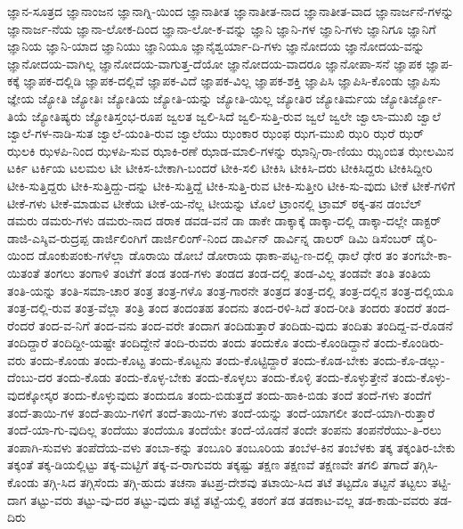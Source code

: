 {ಜ್ಞಾನ-ಸೂತ್ರದ
ಜ್ಞಾನಾಂಜನ
ಜ್ಞಾನಾಗ್ನಿ-ಯಿಂದ
ಜ್ಞಾನಾತೀತ
ಜ್ಞಾನಾತೀತ-ನಾದ
ಜ್ಞಾನಾತೀತ-ವಾದ
ಜ್ಞಾನಾರ್ಜನೆ-ಗಳನ್ನು
ಜ್ಞಾನಾರ್ಜ-ನೆಯ
ಜ್ಞಾನಾ-ಲೋಕ-ದಿಂದ
ಜ್ಞಾನಾ-ಲೋ-ಕ-ವನ್ನು
ಜ್ಞಾನಿ
ಜ್ಞಾನಿ-ಗಳ
ಜ್ಞಾನಿ-ಗಳು
ಜ್ಞಾನಿಗೂ
ಜ್ಞಾನಿಗೆ
ಜ್ಞಾನಿಯ
ಜ್ಞಾನಿ-ಯಾದ
ಜ್ಞಾನಿಯು
ಜ್ಞಾನಿಯೂ
ಜ್ಞಾನೈಶ್ವರ್ಯಾ-ದಿ-ಗಳು
ಜ್ಞಾನೋದಯ
ಜ್ಞಾನೋದಯ-ವನ್ನು
ಜ್ಞಾನೋದಯ-ವಾಗಿಲ್ಲ
ಜ್ಞಾನೋದಯ-ವಾಗುತ್ತ-ದೆಯೋ
ಜ್ಞಾನೋದಯ-ವಾದರೂ
ಜ್ಞಾನೋಪಾ-ಸನೆ
ಜ್ಞಾಪಕ
ಜ್ಞಾಪ-ಕಕ್ಕೆ
ಜ್ಞಾಪಕ-ದಲ್ಲಿಡಿ
ಜ್ಞಾಪಕ-ದಲ್ಲಿವೆ
ಜ್ಞಾಪಕ-ವಿದೆ
ಜ್ಞಾಪಕ-ವಿಲ್ಲ
ಜ್ಞಾಪಕ-ಶಕ್ತಿ
ಜ್ಞಾಪಿಸಿ
ಜ್ಞಾಪಿಸಿ-ಕೊಂಡು
ಜ್ಞಾಪಿಸು
ಜ್ಞೇಯ
ಜ್ಯೋತಿ
ಜ್ಯೋತಿಃ
ಜ್ಯೋತಿಯ
ಜ್ಯೋತಿ-ಯನ್ನು
ಜ್ಯೋತಿ-ಯಿಲ್ಲ
ಜ್ಯೋತಿರ
ಜ್ಯೋತಿರ್ಮಯ
ಜ್ಯೋತಿರ್ಜ್ಯೋ-ತಿಯೆ
ಜ್ಯೋತಿಷ್ಯರು
ಜ್ಯೋತಿಸ್ತಂಭ-ರೂಪ
ಜ್ವಲತ
ಜ್ವಲಿ-ಸಿದೆ
ಜ್ವಲಿ-ಸುತ್ತಿ-ರುವ
ಜ್ವಲೆ
ಜ್ವಲೇ
ಜ್ವಾಲಾ-ಮುಖಿ
ಜ್ವಾಲೆ
ಜ್ವಾಲೆ-ಗಳ-ನಾಡಿ-ಸುತ
ಜ್ವಾಲೆ-ಯಂತಿ-ರುವ
ಜ್ವಾಲೆಯು
ಝಂಕಾರ
ಝಂಫ
ಝಗ-ಮುಖಿ
ಝರಿ
ಝರೆ
ಝರ್
ಝಲಕಿ
ಝಳಪಿ-ನಿಂದ
ಝಳಪಿ-ಸುವ
ಝಾಕಿ-ರಣೆ
ಝಾಡ-ಮಾಲಿ-ಗಳನ್ನು
ಝಾನ್ಸಿ-ರಾ-ಣಿಯು
ಝೃಂಬಿತ
ಝೇಲಮಿನ
ಟರ್ಕಿ
ಟರ್ಕಿಯ
ಟಲಮಲ
ಟೀ
ಟೀಕಿಸ-ಬೇಕಾಗಿ-ಬಂದರೆ
ಟೀಕಿ-ಸಲಿ
ಟೀಕಿಸಿ
ಟೀಕಿಸಿ-ದರು
ಟೀಕಿಸಿದ್ದರು
ಟೀಕಿಸಿದ್ದೀರಿ
ಟೀಕಿ-ಸುತ್ತಿದ್ದರು
ಟೀಕಿ-ಸುತ್ತಿದ್ದು-ದನ್ನು
ಟೀಕಿ-ಸುತ್ತಿದ್ದೆ
ಟೀಕಿ-ಸುತ್ತಿ-ರುವ
ಟೀಕಿ-ಸುತ್ತೀರಿ
ಟೀಕಿ-ಸು-ವುದು
ಟೀಕೆ
ಟೀಕೆ-ಗಳಿಗೆ
ಟೀಕೆ-ಗಳು
ಟೀಕೆ-ಮಾಡುವ
ಟೀಕೆಯ
ಟೀಕೆ-ಯ-ನೆಲ್ಲ
ಟೀಯನ್ನು
ಟೊಲೆ
ಟ್ರಾಂನಲ್ಲಿ
ಟ್ರಾಮ್
ಠಕ್ಕ-ತನ
ಡಂಬೆಲ್
ಡಮರು
ಡಮರು-ಗಳು
ಡಮರು-ನಾದ
ಡರಾಕ
ಡವಡ-ವನೆ
ಡಾ
ಡಾಕೇ
ಡಾಕ್ಕಾಕ್ಕೆ
ಡಾಕ್ಕಾ-ದಲ್ಲಿ
ಡಾಕ್ಕಾ-ದಲ್ಲೇ
ಡಾಕ್ಟರ್
ಡಾಜಿ-ಎಸ್ಶಿವ-ರುದ್ರಪ್ಪ
ಡಾರ್ಜಿಲಿಂಗಿಗೆ
ಡಾರ್ಜಿಲಿಂಗ್-ನಿಂದ
ಡಾರ್ವಿನ್
ಡಾರ್ವಿನ್ನ
ಡಾಲರ್
ಡಿಮಿ
ಡಿಸೆಂಬರ್
ಡೈರಿ-ಯಿಂದ
ಡೊಂಕುಪಂಕು-ಗಳೆಲ್ಲಾ
ಡೊರಾಯಿ
ಡೋಬೆ
ಡೋರಾಯ
ಢಾಕಾ-ಪಟ್ಟ-ಣ-ದಲ್ಲಿ
ಢಾಲೆ
ಢೇರ
ತಂ
ತಂಗಬೇ-ಕಾ-ಯಿತಂತೆ
ತಂಗಲು
ತಂಗಾಳಿ
ತಂಟೆಗೆ
ತಂಡ
ತಂಡ-ಗಳು
ತಂಡದ
ತಂಡ-ದಲ್ಲಿ
ತಂಡ-ವಿಲ್ಲ
ತಂಡವೇ
ತಂತಿ
ತಂತಿಯ
ತಂತಿ-ಯನ್ನು
ತಂತಿ-ಸಮಾ-ಚಾರ
ತಂತ್ರ
ತಂತ್ರ-ಗಳೊ
ತಂತ್ರ-ಗಾರನೇ
ತಂತ್ರದ
ತಂತ್ರ-ದಲ್ಲಿ
ತಂತ್ರ-ದಲ್ಲಿನ
ತಂತ್ರ-ದಲ್ಲಿಯೂ
ತಂತ್ರ-ದಲ್ಲಿ-ರುವ
ತಂತ್ರ-ವೆಲ್ಲಾ
ತಂತ್ರಿ
ತಂದ
ತಂದಂತಹ
ತಂದನು
ತಂದ-ರಳಿ-ಸಿದೆ
ತಂದ-ರೀತಿ
ತಂದರು
ತಂದರೆ
ತಂದ-ರೆಂದರೆ
ತಂದ-ವ-ನಿಗೆ
ತಂದ-ವನು
ತಂದ-ವರೇ
ತಂದಾಗ
ತಂದಿಡುತ್ತಾರೆ
ತಂದಿಡು-ವುದು
ತಂದಿತು
ತಂದಿದ್ದ-ವ-ರೊಡನೆ
ತಂದಿದ್ದಾರೆ
ತಂದಿದ್ದೀ-ಯಷ್ಟೇ
ತಂದಿದ್ದೇನೆ
ತಂದಿ-ರುವರು
ತಂದು
ತಂದುಕೊ
ತಂದು-ಕೊಂಡಿದ್ದಾನೆ
ತಂದು-ಕೊಂಡಿರು-ವರು
ತಂದು-ಕೊಂಡು
ತಂದು-ಕೊಟ್ಟ
ತಂದು-ಕೊಟ್ಟನು
ತಂದು-ಕೊಟ್ಟಿದ್ದಾರೆ
ತಂದು-ಕೊಡ-ಬೇಕು
ತಂದು-ಕೊ-ಡಲ್ಲು-ದೆಂಬು-ದರ
ತಂದು-ಕೊಡು
ತಂದು-ಕೊಳ್ಳ-ಬೇಕು
ತಂದು-ಕೊಳ್ಳಲು
ತಂದು-ಕೊಳ್ಳಿ
ತಂದು-ಕೊಳ್ಳುತ್ತೇನೆ
ತಂದು-ಕೊಳ್ಳು-ವುದಕ್ಕೋಸ್ಕರ
ತಂದು-ಕೊಳ್ಳುವುದು
ತಂದುದೂ
ತಂದು-ಬಿಡುತ್ತದೆ
ತಂದು-ಹಾಕಿ-ಬಿಡು
ತಂದೆ
ತಂದೆ-ಗಳು
ತಂದೆಗೆ
ತಂದೆ-ತಾಯಿ-ಗಳ
ತಂದೆ-ತಾಯಿ-ಗಳಿಗೆ
ತಂದೆ-ತಾಯಿ-ಗಳು
ತಂದೆ-ಯನ್ನು
ತಂದೆ-ಯಾಗಲೀ
ತಂದೆ-ಯಾಗಿ-ರುತ್ತಾರೆ
ತಂದೆ-ಯಾ-ಗು-ವುದಿಲ್ಲ
ತಂದೆಯು
ತಂದೆಯೂ
ತಂದೆಯೇ
ತಂದೆ-ಯೊಡನೆ
ತಂದೇ
ತಂಪನು
ತಂಪನೆರೆಯು-ತಿ-ರಲು
ತಂಪಾಗಿ-ಸುವಳು
ತಂಪೆದೆಯ-ವಳು
ತಂಬಾ-ಕನ್ನು
ತಂಬೂರಿ
ತಂಬೂರಿಯ
ತಂಬೆಳ-ಕಿನ
ತಂಬೆಳಕು
ತಕ್ಕ
ತಕ್ಕಂತಿರ-ಬೇಕು
ತಕ್ಕಂತೆ
ತಕ್ಕ-ಡಿಯಲ್ಲಿಟ್ಟು
ತಕ್ಕ-ಮಟ್ಟಿಗೆ
ತಕ್ಕ-ವ-ರಾಗುವರು
ತಕ್ಕಷ್ಟು
ತಕ್ಷಣ
ತಕ್ಷಣವೆ
ತಕ್ಷಣವೇ
ತಗಲಿ
ತಗಾದೆ
ತಗ್ಗಿಸಿ-ಕೊಂಡು
ತಗ್ಗಿ-ಸಿದ
ತಗ್ಗಿಸೆಂದು
ತಗ್ಗಿ-ಹುದು
ತಚನಾ
ತಟಪ್ರ-ದೇಶವು
ತಟಾಯಿ-ಸಿದ
ತಟೆ
ತಟ್ಟದೊ
ತಟ್ಟನೆ
ತಟ್ಟಲು
ತಟ್ಟಿ-ದಾಗ
ತಟ್ಟು-ವರು
ತಟ್ಟು-ವು-ದರ
ತಟ್ಟು-ವುದು
ತಟ್ಟೆ
ತಟ್ಟೆ-ಯಲ್ಲಿ
ತಠಂಗೆ
ತಡ
ತಡಕಾಟ-ವಲ್ಲ
ತಡ-ಕಾಡು-ವವರು
ತಡ-ದಿರು
}

